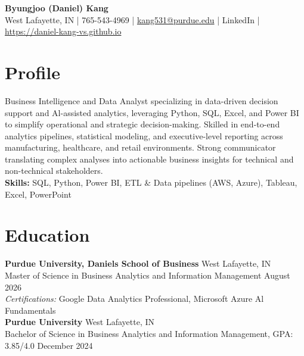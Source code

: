 \documentclass[11pt,a4paper]{article}
\begin{document}
\pagestyle{empty}

\begin{center}
    {\Huge \textbf{Byungjoo (Daniel) Kang}}  \\[4pt]
    West Lafayette, IN | 765-543-4969 | \href{mailto:kang531@purdue.edu}{kang531@purdue.edu} | LinkedIn | \url{https://daniel-kang-vs.github.io}  
\end{center}

\section*{Profile}  
Business Intelligence and Data Analyst specializing in data-driven decision support and Al-assisted analytics, leveraging Python, SQL, Excel, and Power BI to simplify operational and strategic decision-making.   Skilled in end-to-end analytics pipelines, statistical modeling, and executive-level reporting across manufacturing, healthcare, and retail environments.   Strong communicator translating complex analyses into actionable business insights for technical and non-technical stakeholders.  \\[4pt]
\textbf{Skills:} SQL, Python, Power BI, ETL \& Data pipelines (AWS, Azure), Tableau, Excel, PowerPoint  

\section*{Education}  
\noindent
\textbf{Purdue University, Daniels School of Business} \hfill West Lafayette, IN   \\
Master of Science in Business Analytics and Information Management \hfill August 2026   \\
\textit{Certifications:} Google Data Analytics Professional, Microsoft Azure Al Fundamentals   \\[6pt]
\textbf{Purdue University} \hfill West Lafayette, IN   \\
Bachelor of Science in Business Analytics and Information Management, GPA: 3.85/4.0 \hfill December 2024  

\end{document}
